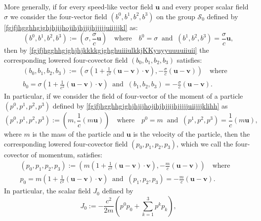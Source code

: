 \documentclass{article}
\theoremstyle{definition}
\theoremstyle{remark}
\renewcommand{\vec}[1]{\mathbf{#1}}
\newcommand{\er}{\eqref}
\newcommand{\er}{\eqref}
\begin{document}
More generally, if for every speed-like vector field $\vec u$ and
every proper scalar field $\sigma$  we consider the four-vector
field $(b^0,b^1,b^2,b^3)$ on the group $\mathcal{S}_0$ defined by
\er{fgjfjhgghhgjghjhjijhojihjhjjijhjjjjjuiijjjkl} as:
\begin{equation}\label{fgjfjhgghhgjghjhjijhojihjhjjijhjjjjjuiijjjklhhh}
(b^0,b^1,b^2,b^3):=\left(\sigma,\frac{\sigma}{c}\vec
u\right)\quad\text{where}\quad
b^0=\sigma\;\;\text{and}\;\;(b^1,b^2,b^3)=\frac{\sigma}{c}\vec u,
\end{equation}
then by \er{fgjfjhgghhgjghjhjkkkkgjghghuiiiulkkjKKyuyyuuuuiiuii} the
corresponding lowered four-covector field $(b_0,b_1,b_2,b_3)$
satisfies:
\begin{multline}\label{fgjfjhgghhgjghjhjijhojihjhjjijhjjjjjuiikkjjnjjbj}
(b_0,b_1,b_2,b_3):=\left(\sigma\left(1+\frac{1}{c^2}\left(\vec
u-\vec v\right)\cdot\vec v\right),-\frac{\sigma}{c}\left(\vec u-\vec
v\right)\right)\quad\text{where}\quad\\
b_0=\sigma\left(1+\frac{1}{c^2}\left(\vec u-\vec v\right)\cdot\vec
v\right)\;\;\text{and}\;\;(b_1,b_2,b_3)=-\frac{\sigma}{c}\left(\vec
u-\vec v\right).
\end{multline}
In particular, if we consider the field of four-vector of the moment
of a particle $(p^0,p^1,p^2,p^3)$ defined by
\er{fgjfjhgghhgjghjhjijhojihjhjjijhjjjjjuiijjjklihh} as
\begin{equation}\label{fgjfjhgghhgjghjhjijhojihjhjjijhjjjjjuiijjjklihhjjj}
(p^0,p^1,p^2,p^3):=\left(m,\frac{1}{c}(m\vec
u)\right)\quad\text{where}\quad
p^0=m\;\;\text{and}\;\;(p^1,p^2,p^3)=\frac{1}{c}(m\vec u),
\end{equation}
where $m$ is the mass of the particle and $\vec u$ is the velocity
of the particle, then the corresponding lowered four-covector field
$(p_0,p_1,p_2,p_3)$, which we call the four-covector of momentum,
satisfies:
\begin{multline}\label{fgjfjhgghhgjghjhjijhojihjhjjijhjjjjjuiikkjjnjjbjhjh}
(p_0,p_1,p_2,p_3):=\left(m\left(1+\frac{1}{c^2}\left(\vec u-\vec
v\right)\cdot\vec v\right),-\frac{m}{c}\left(\vec u-\vec
v\right)\right)\quad\text{where}\quad\\
p_0=m\left(1+\frac{1}{c^2}\left(\vec u-\vec v\right)\cdot\vec
v\right)\;\;\text{and}\;\;(p_1,p_2,p_3)=-\frac{m}{c}\left(\vec
u-\vec v\right).
\end{multline}
In particular, the scalar field $J_0$ defined by
\begin{equation}\label{fgjfjhgghhgjghjhjkkkkgjghghuiiiulkkjKKyuyyu0ioioiogghghghgghghhg}
J_0:=-\frac{c^2}{2m}\left(p^0p_0+\sum_{k=1}^{3}p^kp_k\right),
\end{equation}
\end{document}
